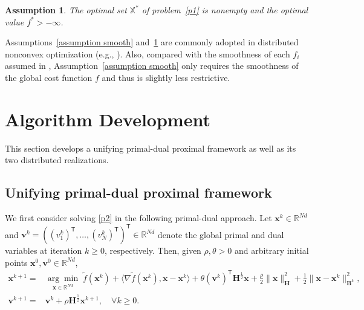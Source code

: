 \documentclass[12pt,draftcls,onecolumn]{IEEEtran}
\newcommand{\bH}{{\mathbf{H}}}
\newtheorem{assumption}{Assumption}
\begin{document}
\begin{assumption}\label{assumption: optimality}
The optimal set $\mathbb{X}^*$ of problem~\eqref{p1} is nonempty and the optimal value $f^* >-\infty$.
\end{assumption}

Assumptions~\ref{assumption smooth} and~\ref{assumption: optimality} are commonly adopted in distributed nonconvex optimization  (e.g., \cite{sun2018distributed, sun_distributed_2019, yi2021linear, yi2022sublinear}). Also, compared with the smoothness of each $f_i$ assumed in \cite{yi2022sublinear,yi2021linear}, Assumption~\ref{assumption smooth} only requires the smoothness of the global cost function ${f}$ and thus is slightly less restrictive.


\section{Algorithm Development}\label{section: algorithm development}
This section develops a unifying primal-dual proximal framework as well as its two distributed realizations.

\subsection{Unifying primal-dual proximal framework}\label{subsection:algorithm development UPP}
We first consider solving \eqref{p2} in the following primal-dual approach. Let $\mathbf{x}^k\in \mathbb{R}^{Nd}$ and $\mathbf{v}^{k}=((v_1^k)^{\mathsf{T}}, \dots, (v_N^k)^{\mathsf{T}})^{\mathsf{T}}\in \mathbb{R}^{Nd}$ denote the global primal and dual variables at iteration $k \geq 0$, respectively. Then, given $\rho, \theta>0$ and arbitrary initial points $\mathbf{x}^0,\mathbf{v}^0 \in \mathbb{R}^{Nd}$, 
\begin{align}
	\label{argmin approximation primal} \mathbf{x}^{k+1}=&\underset{\mathbf{x} \in \mathbb{R}^{N d}}{\arg \min}\;\tilde{f}(\mathbf{x}^k) + \langle \nabla \tilde{f}(\mathbf{x}^k), \mathbf{x}-\mathbf{x}^k \rangle +\theta(\mathbf{v}^{k})^{\mathsf{T}} \bH^{\frac{1}{2}} \mathbf{x}+\frac{\rho}{2}\|\mathbf{x}\|_{\mathbf{H}}^{2}+ \frac{1}{2} \|\mathbf{x}-\mathbf{x}^k\|^2_{\mathbf{B}^k}, \\ 
	\label{argmin approximation dual} \mathbf{v}^{k+1}=&\mathbf{v}^{k}+\rho \bH^{\frac{1}{2}} \mathbf{x}^{k+1}, \quad \forall k \geq 0.
\end{align}
\end{document}
